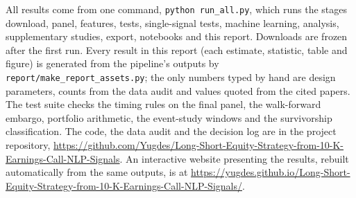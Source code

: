 \documentclass[11pt,a4paper]{article}
\begin{document}
All results come from one command, \texttt{python run\_all.py}, which runs the stages download, panel, features, tests,
single-signal tests, machine learning, analysis, supplementary studies, export, notebooks and this report. Downloads are
frozen after the first run. Every result in this report (each estimate, statistic, table and figure) is generated from
the pipeline's outputs by \texttt{report/make\_report\_assets.py}; the only numbers typed by hand are design parameters,
counts from the data audit and values quoted from the cited papers. The test suite checks the timing rules on the final panel,
the walk-forward embargo, portfolio arithmetic, the event-study windows and the survivorship classification. The code,
the data audit and the decision log are in the project repository,
\url{https://github.com/Yugdes/Long-Short-Equity-Strategy-from-10-K-Earnings-Call-NLP-Signals}. An interactive website
presenting the results, rebuilt automatically from the same outputs, is at
\url{https://yugdes.github.io/Long-Short-Equity-Strategy-from-10-K-Earnings-Call-NLP-Signals/}.
\end{document}
